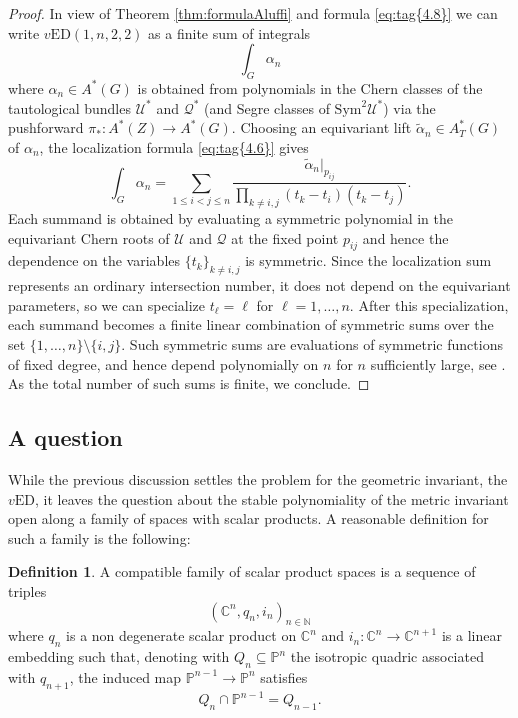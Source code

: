 \documentclass[11pt]{article}
\numberwithin{equation}{section}
\numberwithin{figure}{section}
\theoremstyle{plain}
\theoremstyle{definition}
\newtheorem{defn}[thm]{Definition}
\theoremstyle{remark}
\newcommand{\su}{\subseteq}
\newcommand{\C}{\mathbb{C}}
\renewcommand{\P}{\mathbb{P}}
\newcommand{\Sym}{\mathrm{Sym}}
\newcommand{\vED}{v\mathrm{ED}}
\begin{document}
\begin{proof}
In view of Theorem \ref{thm:formulaAluffi} and formula \eqref{eq:tag{4.8}} we can write $\vED(1,n,2,2)$ as a finite sum of integrals
\[
\int_G \alpha _n
\]
where $\alpha_n\in A^\ast(G)$ is obtained from polynomials
in the Chern classes of the tautological bundles $\mathcal U^\ast$ and $\mathcal Q^\ast$
(and Segre classes of $\Sym^2\mathcal U^\ast$) via the pushforward
$\pi_\ast : A^\ast(Z)\to A^\ast(G)$. Choosing an equivariant lift
$\widetilde{\alpha}_n\in A_T^\ast(G)$ of $\alpha_n$, the localization
formula \eqref{eq:tag{4.6}} gives
\[
\int_{G} \alpha_n
=
\sum_{1\le i<j\le n}
\frac{\widetilde{\alpha}_n|_{p_{ij}}}{
\prod_{k\neq i,j}(t_k-t_i)(t_k-t_j)
}.
\]
Each summand is obtained by evaluating a symmetric polynomial in the
equivariant Chern roots of $\mathcal U$ and $\mathcal Q$ at the fixed point
$p_{ij}$ and hence the dependence on the variables $\{t_k\}_{k\neq i,j}$ is symmetric.
Since the localization sum represents an ordinary intersection number, it does not depend on the equivariant parameters, so we can specialize $t_\ell=\ell$ for $\ell=1,\dots,n$.
After this specialization, each summand becomes a finite linear combination
of symmetric sums over the set $\{1,\dots,n\}\setminus\{i,j\}$.
Such symmetric sums are evaluations of symmetric functions of fixed degree,
and hence depend polynomially on $n$ for $n$ sufficiently large,
see \cite[Chapter 1, Section 2]{MacD95}. As the total number of such sums is finite, we conclude.
\end{proof}


\subsection{A question}\label{sec:question}

While the previous discussion settles the problem for the geometric invariant, the $\vED$, it leaves the question about the stable polynomiality of the metric invariant open along a family of spaces with scalar products. A reasonable definition for such a family is the following:
\begin{defn}
    A compatible family of scalar product spaces is a sequence of triples
    \[
    \left( \C^n, q_n , i_n\right)_{n\in\mathbb N}
    \]
    where $q_n$ is a non degenerate scalar product on $\C^n$ and $i_n :\C^n \to \C^{n+1}$ is a linear embedding such that, denoting with $Q_n \su \P^n$ the isotropic quadric associated with $q_{n+1}$, the induced map $\P^{n-1}\to \P^n$ satisfies
    \[
    Q_n \cap \P^{n-1} = Q_{n-1}.
    \]
\end{defn}
\end{document}
